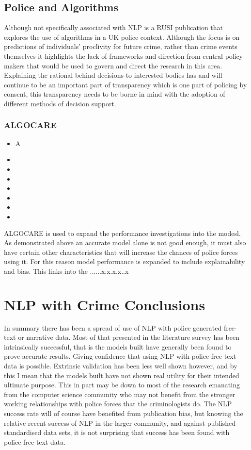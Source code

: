 \subsection{Police and Algorithms}

Although not specifically associated with NLP  \textcite{babuta2018machine} is a RUSI publication that explores the use of algorithms in a UK police context. Although the focus is on predictions of individuals' proclivity for future crime, rather than crime events themselves it highlights the lack of frameworks and direction from central policy makers that would be used to govern and direct the research in this area. Explaining the rational behind decisions to interested bodies has and will continue to be an important part of transparency which is one part of policing by consent, this transparency needs to be borne in mind with the adoption of different methods of decision support. 

\subsubsection{ALGOCARE}

\begin{itemize}
\item{A}
\item{}
\item{}
\item{}
\item{}
\item{}
\item{}
\item{}
\end{itemize}

ALGOCARE is used to expand the performance investigations into the modesl. As demonstrated above an accurate model alone is not good enough, it must also have certain other characteristics that will increase the chances of police forces using it. For this reason model performance is expanded to include explainability and bias. This links into the ......x.x.x.x..x 

\section{ NLP with Crime Conclusions} In summary there has been a spread of use of NLP with police generated free-text or narrative data. Most of that presented in the literature survey has been intrinsically successful, that is the models built have generally been found to prove accurate results. Giving confidence that using NLP with police free text data is possible. Extrinsic validation has been less well shown however, and by this I mean that the models built have not shown real utility for their intended ultimate purpose.  This in part may be down to most of the research emanating from the computer science community who may not benefit from the stronger working relationships with police forces that the criminologists do. The NLP success rate will of course have benefited from publication bias, but knowing the relative recent success of NLP in the larger community, and against published standardised data sets,  it is not surprising that success has been found with police free-text data.

